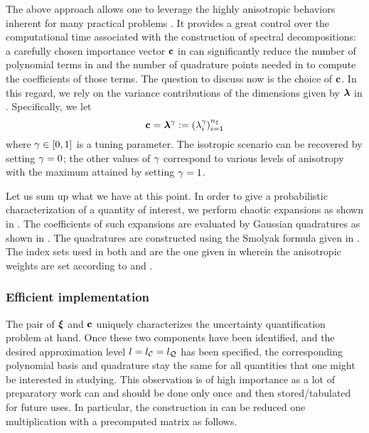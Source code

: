 The above approach allows one to leverage the highly anisotropic behaviors inherent for many practical problems \cite{nobile2008}.
It provides a great control over the computational time associated with the construction of spectral decompositions: a carefully chosen importance vector $\mathbf{c}$ in  can significantly reduce the number of polynomial terms in  and the number of quadrature points needed in  to compute the coefficients of those terms.
The question to discuss now is the choice of $\mathbf{c}$.
In this regard, we rely on the variance contributions of the dimensions given by  $\bm{\lambda}$ in .
Specifically, we let
\begin{equation} \elab{dimension-anisotropy}
  \dimensionAnisotropy = \dimensionContribution^\anisotropyKnob := (\lambda_i^\anisotropyKnob)_{i = 1}^\nvars
\end{equation}
where $\gamma \in [0, 1]$ is a tuning parameter.
The isotropic scenario can be recovered by setting $\gamma = 0$; the other values of $\gamma$ correspond to various levels of anisotropy with the maximum attained by setting $\gamma = 1$.

Let us sum up what we have at this point.
In order to give a probabilistic characterization of a quantity of interest, we perform chaotic expansions as shown in .
The coefficients of such expansions are evaluated by Gaussian quadratures as shown in .
The quadratures are constructed using the Smolyak formula given in .
The index sets used in both  and  are the one given in  wherein the anisotropic weights are set according to  and .

\subsubsection{Efficient implementation}
The pair of $\bm{\xi}$ and $\mathbf{c}$ uniquely characterizes the uncertainty quantification problem at hand.
Once these two components have been identified, and the desired approximation level $l = {l_\mathcal{C}} = {l_\mathcal{Q}}$ has been specified, the corresponding polynomial basis and quadrature stay the same for all quantities that one might be interested in studying.
This observation is of high importance as a lot of preparatory work can and should be done only once and then stored/tabulated for future uses.
In particular, the construction in  can be reduced one multiplication with a precomputed matrix as follows.

